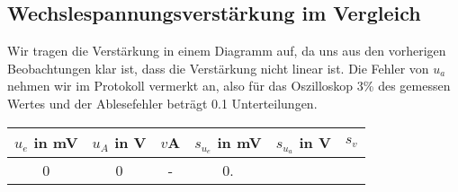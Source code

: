 \subsection{Wechslespannungsverstärkung im Vergleich}

Wir tragen die Verstärkung in einem Diagramm auf, da uns aus den vorherigen Beobachtungen klar ist, dass die Verstärkung nicht linear ist. Die Fehler von $u_a$
nehmen wir im Protokoll vermerkt an, also für das Oszilloskop 3\% des gemessen Wertes und der Ablesefehler beträgt 0.1 Unterteilungen.
\begin{table}[h]
    \centering
    \begin{tabular}[h]{c|c|c|c|c|c}


        $u_e$ in mV & $u_A$ in V & $v${A} & $s_{u_e}$ in mV&  $s_{u_a}$ in V & $s_v$ \\
       \hline
        0 & 0 & - & 0.
    \end{tabular}
\end{table}
